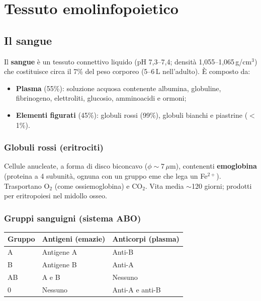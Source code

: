 \documentclass[11pt,a4paper,openright,twoside]{book}
\theoremstyle{definition}
\theoremstyle{plain}
\theoremstyle{remark}
\newcommand{\CO}{\ensuremath{\text{CO}_2}}
\newcommand{\Oc}{\ensuremath{\text{O}_2}}
\begin{document}
\section{Tessuto emolinfopoietico}

\subsection{Il sangue}

Il \textbf{sangue} è un tessuto connettivo liquido (pH 7,3--7,4; densità 1,055--1,065\,g/cm$^3$) che costituisce circa il 7\% del peso corporeo (5--6\,L nell'adulto). È composto da:
\begin{itemize}
  \item \textbf{Plasma} (55\%): soluzione acquosa contenente albumina, globuline, fibrinogeno, elettroliti, glucosio, amminoacidi e ormoni;
  \item \textbf{Elementi figurati} (45\%): globuli rossi (99\%), globuli bianchi e piastrine ($<$1\%).
\end{itemize}

\subsubsection{Globuli rossi (eritrociti)}
Cellule anucleate, a forma di disco biconcavo ($\phi \sim 7$\,$\mu$m), contenenti \textbf{emoglobina} (proteina a 4 subunità, ognuna con un gruppo eme che lega un Fe$^{2+}$). Trasportano \Oc{} (come ossiemoglobina) e \CO{}. Vita media $\sim$120 giorni; prodotti per eritropoiesi nel midollo osseo.

\subsubsection{Gruppi sanguigni (sistema ABO)}

\begin{center}
\begin{tabular}{lll}
\toprule
\textbf{Gruppo} & \textbf{Antigeni (emazie)} & \textbf{Anticorpi (plasma)} \\
\midrule
A & Antigene A & Anti-B \\
B & Antigene B & Anti-A \\
AB & A e B & Nessuno \\
0 & Nessuno & Anti-A e anti-B \\
\bottomrule
\end{tabular}
\end{center}
\end{document}

